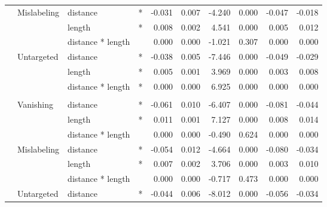 \begin{longtable}[t]{llllrrrrrr}
\cmidrule{2-10}\nopagebreak
\hspace{1em} & Mislabeling & distance & * & -0.031 & 0.007 & -4.240 & 0.000 & -0.047 & -0.018\\
\cmidrule{3-10}\nopagebreak
\hspace{1em} &  & length & * & 0.008 & 0.002 & 4.541 & 0.000 & 0.005 & 0.012\\
\cmidrule{3-10}\nopagebreak
\hspace{1em} &  & distance * length &  & 0.000 & 0.000 & -1.021 & 0.307 & 0.000 & 0.000\\
\cmidrule{2-10}\nopagebreak
\hspace{1em} & Untargeted & distance & * & -0.038 & 0.005 & -7.446 & 0.000 & -0.049 & -0.029\\
\cmidrule{3-10}\nopagebreak
\hspace{1em} &  & length & * & 0.005 & 0.001 & 3.969 & 0.000 & 0.003 & 0.008\\
\cmidrule{3-10}\nopagebreak
\hspace{1em} &  & distance * length & * & 0.000 & 0.000 & 6.925 & 0.000 & 0.000 & 0.000\\
\cmidrule{1-10}\pagebreak[0]
\addlinespace[0.3em]
\multicolumn{10}{l}{\textbf{Faster R-CNN}}\\
\hspace{1em} & Vanishing & distance & * & -0.061 & 0.010 & -6.407 & 0.000 & -0.081 & -0.044\\
\cmidrule{3-10}\nopagebreak
\hspace{1em} &  & length & * & 0.011 & 0.001 & 7.127 & 0.000 & 0.008 & 0.014\\
\cmidrule{3-10}\nopagebreak
\hspace{1em} &  & distance * length &  & 0.000 & 0.000 & -0.490 & 0.624 & 0.000 & 0.000\\
\cmidrule{2-10}\nopagebreak
\hspace{1em} & Mislabeling & distance & * & -0.054 & 0.012 & -4.664 & 0.000 & -0.080 & -0.034\\
\cmidrule{3-10}\nopagebreak
\hspace{1em} &  & length & * & 0.007 & 0.002 & 3.706 & 0.000 & 0.003 & 0.010\\
\cmidrule{3-10}\nopagebreak
\hspace{1em} &  & distance * length &  & 0.000 & 0.000 & -0.717 & 0.473 & 0.000 & 0.000\\
\cmidrule{2-10}\nopagebreak
\hspace{1em} & Untargeted & distance & * & -0.044 & 0.006 & -8.012 & 0.000 & -0.056 & -0.034\\

\end{longtable}
